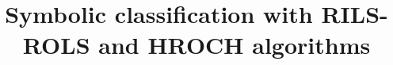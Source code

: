\documentclass{bmcart}
\begin{document}
\begin{frontmatter}

\begin{fmbox}


\title{Symbolic classification with RILS-ROLS and HROCH algorithms}


\author[
  addressref={aff1},                   %
  corref={aff1},                       %
  email={kartelj@matf.bg.ac.rs}   %
]{ }
\author[
  addressref={aff2},
  email={marko.djukanovic@pmf.unibl.org}
]{ }

\author[
email={jan.pigos@gmail.com}
]{ }


\address[id=aff1]{%
  ,             %
  ,          %
  ,                              %
}
\address[id=aff2]{%
  ,
  ,
  ,
}


\end{fmbox}
\end{frontmatter}
\end{document}

